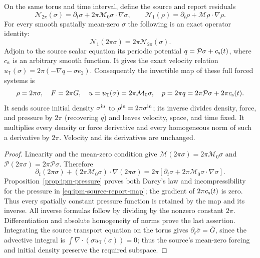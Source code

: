 \begin{proposition}
\label{prop:ipm-coefficient-map}
On the same torus and time interval, define the source and report residuals
\[
 \mathcal N_{2\pi}(\sigma)=\partial_t\sigma+
                   2\pi\mathcal M_0\sigma\cdot\nabla\sigma,
 \qquad
 \mathcal N_1(\rho)=\partial_t\rho+\mathcal M\rho\cdot\nabla\rho.
\]
For every smooth spatially mean-zero $\sigma$ the following is an exact
operator identity:
\begin{equation}\label{eq:ipm-coefficient-intertwining}
 \mathcal N_1(2\pi\sigma)=2\pi\mathcal N_{2\pi}(\sigma).
\end{equation}
Adjoin to the source scalar equation its periodic potential
$q=\mathcal P\sigma+c_{\rm s}(t)$, where $c_{\rm s}$ is an arbitrary smooth
function. It gives the exact velocity relation
$u_{\mathbb T}(\sigma)=2\pi(-\nabla q-\sigma e_2)$.
Consequently the invertible map of these full forced systems is
\begin{equation}\label{eq:ipm-source-report-map}
 \rho=2\pi\sigma,\quad F=2\pi G,\quad
 u=u_{\mathbb T}(\sigma)=2\pi\mathcal M_0\sigma,
 \quad p=2\pi q=2\pi\mathcal P\sigma+2\pi c_{\rm s}(t).
\end{equation}
It sends source initial density $\sigma^{\rm in}$ to
$\rho^{\rm in}=2\pi\sigma^{\rm in}$; its inverse divides density, force,
and pressure by $2\pi$ (recovering $q$) and leaves velocity, space, and time fixed.
It multiplies every density or force derivative and every homogeneous norm
of such a derivative by $2\pi$. Velocity and its derivatives are unchanged.
\end{proposition}
\begin{proof}
Linearity and the mean-zero condition give
$\mathcal M(2\pi\sigma)=2\pi\mathcal M_0\sigma$ and
$\mathcal P(2\pi\sigma)=2\pi\mathcal P\sigma$. Therefore
\[
 \partial_t(2\pi\sigma)+
 (2\pi\mathcal M_0\sigma)\cdot\nabla(2\pi\sigma)
 =2\pi[\partial_t\sigma+
        2\pi\mathcal M_0\sigma\cdot\nabla\sigma].
\]
Proposition~\ref{prop:ipm-pressure} proves both Darcy's law and
incompressibility for the pressure in \eqref{eq:ipm-source-report-map};
the gradient of $2\pi c_{\rm s}(t)$ is zero. Thus every spatially constant
pressure function is retained by the map and its inverse.
All inverse formulas follow by dividing by the nonzero constant $2\pi$.
Differentiation and absolute homogeneity of norms prove the last assertion.
Integrating the source transport equation on the torus gives
$\partial_t\overline\sigma=\overline G$, since the advective integral is
$\int\nabla\cdot(\sigma u_{\mathbb T}(\sigma))=0$; thus the source's
mean-zero forcing and initial density preserve the required subspace.
\end{proof}

